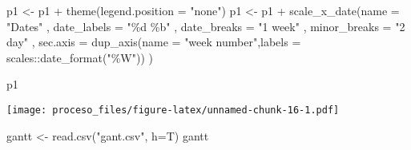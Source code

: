 \documentclass[
]{article}
\newenvironment{Shaded}{\begin{snugshade}}{\end{snugshade}}
\newcommand{\AttributeTok}[1]{\textcolor[rgb]{0.77,0.63,0.00}{#1}}
\newcommand{\FunctionTok}[1]{\textcolor[rgb]{0.00,0.00,0.00}{#1}}
\newcommand{\NormalTok}[1]{#1}
\newcommand{\OtherTok}[1]{\textcolor[rgb]{0.56,0.35,0.01}{#1}}
\newcommand{\SpecialCharTok}[1]{\textcolor[rgb]{0.00,0.00,0.00}{#1}}
\newcommand{\StringTok}[1]{\textcolor[rgb]{0.31,0.60,0.02}{#1}}
\begin{document}
\begin{Shaded}
\begin{Highlighting}[]
\NormalTok{p1 }\OtherTok{\textless{}{-}}\NormalTok{ p1 }\SpecialCharTok{+}  \FunctionTok{theme}\NormalTok{(}\AttributeTok{legend.position =} \StringTok{"none"}\NormalTok{)}
\NormalTok{p1 }\OtherTok{\textless{}{-}}\NormalTok{ p1 }\SpecialCharTok{+} \FunctionTok{scale\_x\_date}\NormalTok{(}\AttributeTok{name =} \StringTok{"Dates"}
\NormalTok{                        , }\AttributeTok{date\_labels =} \StringTok{"\%d \%b"}
\NormalTok{                        , }\AttributeTok{date\_breaks =} \StringTok{"1 week"}
\NormalTok{                        , }\AttributeTok{minor\_breaks =} \StringTok{"2 day"}
\NormalTok{                        , }\AttributeTok{sec.axis =} \FunctionTok{dup\_axis}\NormalTok{(}\AttributeTok{name =} \StringTok{"week number"}\NormalTok{,}\AttributeTok{labels =}\NormalTok{   scales}\SpecialCharTok{::}\FunctionTok{date\_format}\NormalTok{(}\StringTok{"\%W"}\NormalTok{))}
\NormalTok{                        )}
  
\NormalTok{p1}
\end{Highlighting}
\end{Shaded}

\texttt{[image: proceso\_files/figure-latex/unnamed-chunk-16-1.pdf]}

\begin{Shaded}
\begin{Highlighting}[]
\NormalTok{gantt }\OtherTok{\textless{}{-}} \FunctionTok{read.csv}\NormalTok{(}\StringTok{"gant.csv"}\NormalTok{, }\AttributeTok{h=}\NormalTok{T)}
\NormalTok{gantt}
\end{Highlighting}
\end{Shaded}
\end{document}
